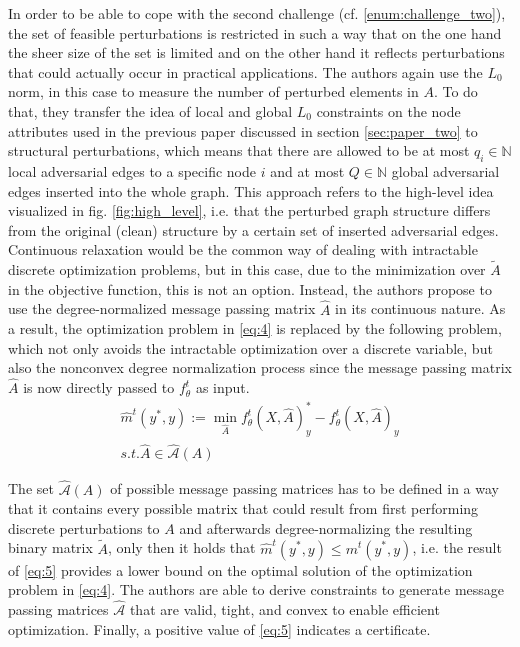 \documentclass[a4paper,preprint]{sig-alternate}
\begin{document}
In order to be able to cope with the second challenge (cf. \ref{enum:challenge_two}), the set of feasible perturbations
is restricted in such a way that on the one hand the sheer size of the set is limited and on the other hand
it reflects perturbations that could actually occur in practical applications. \cite{10.1145/3394486.3403217}
The authors again use the $L_0$ norm, in this case to measure the number of perturbed elements in $A$.
To do that, they transfer the idea of local and global $L_0$ constraints on the node attributes used in the previous paper 
discussed in section \ref{sec:paper_two} to structural perturbations, which means that there are allowed to be at most
$q_i \in \mathbb{N}$ local adversarial edges to a specific node $i$ and at most $Q \in \mathbb{N}$ global adversarial
edges inserted into the whole graph. \cite{10.1145/3394486.3403217}
This approach refers to the high-level idea visualized in fig. \ref{fig:high_level}, i.e. that the perturbed graph structure
differs from the original (clean) structure by a certain set of inserted adversarial edges.\newline
Continuous relaxation would be the common way of dealing with intractable discrete optimization problems,
but in this case, due to the minimization over $\tilde{A}$ in the objective function, this is not an option. \cite{10.1145/3394486.3403217}
Instead, the authors propose to use the degree-normalized message passing matrix $\hat{A}$ in its continuous nature.
As a result, the optimization problem in \ref{eq:4} is replaced by the following problem, which not only avoids 
the intractable optimization over a discrete variable, but also the nonconvex degree normalization process
since the message passing matrix $\hat{A}$ is now directly passed to $f_{\theta}^t$ as input. \cite{10.1145/3394486.3403217}
\begin{gather}
\label{eq:5}
    \hat{m}^t (y^{\ast}, y) := \min_{\hat{A}} f_{\theta}^t (X, \hat{A})_y^{\ast}
    - f_{\theta}^t (X, \hat{A})_y \\
    s.t. \hat{A} \in \mathcal{\hat{A}}(A) \nonumber
\end{gather}

\vfill
\pagebreak

The set $\mathcal{\hat{A}}(A)$ of possible message passing matrices has to be defined in a way that it contains
every possible matrix that could result from first performing discrete perturbations to $A$ and afterwards 
degree-normalizing the resulting binary matrix $\tilde{A}$, only then it holds that $\hat{m}^t (y^{\ast}, y) \leq m^t (y^{\ast}, y)$, 
i.e. the result of \ref{eq:5} provides a lower bound on the optimal solution of the optimization problem in \ref{eq:4}. \cite{10.1145/3394486.3403217}
The authors are able to derive constraints to generate message passing matrices $\mathcal{\hat{A}}$
that are valid, tight, and convex to enable efficient optimization.
Finally, a positive value of \ref{eq:5} indicates a certificate. \cite{10.1145/3394486.3403217} \newline
\end{document}

